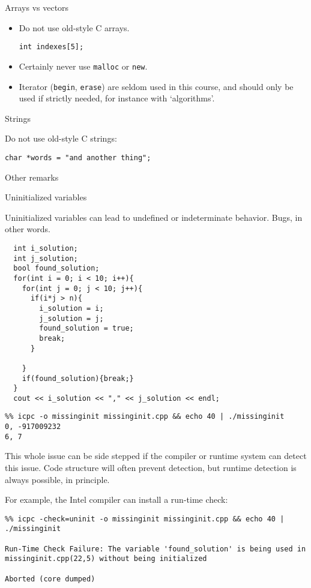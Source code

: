  {Arrays vs vectors}

\begin{itemize}
\item Do not use old-style C arrays.
\begin{lstlisting}
int indexes[5];    
\end{lstlisting}
\item Certainly never use \lstinline{malloc} or \lstinline{new}.
\item Iterator (\lstinline{begin}, \lstinline{erase}) are
  seldom used in this course, and should only be used if strictly needed,
  for instance with `algorithms'.
\end{itemize}

 {Strings}

Do not use old-style C strings:
\begin{lstlisting}
char *words = "and another thing";
\end{lstlisting}

 {Other remarks}

 {Uninitialized variables}

Uninitialized variables can lead to undefined or indeterminate behavior.
Bugs, in other words.

\lstset{language=C++}
\begin{lstlisting}
  int i_solution;
  int j_solution;
  bool found_solution;
  for(int i = 0; i < 10; i++){
    for(int j = 0; j < 10; j++){
      if(i*j > n){
        i_solution = i;
        j_solution = j;
        found_solution = true;
        break;
      }

    }
    if(found_solution){break;}
  }
  cout << i_solution << "," << j_solution << endl;
\end{lstlisting}

\begin{verbatim}
%% icpc -o missinginit missinginit.cpp && echo 40 | ./missinginit
0, -917009232
6, 7
\end{verbatim}

This whole issue can be side stepped if the compiler or runtime system
can detect this issue.
Code structure will often prevent detection, 
but runtime detection is always possible, in principle.

For example, the Intel compiler can install a run-time check:

\begin{verbatim}
%% icpc -check=uninit -o missinginit missinginit.cpp && echo 40 | ./missinginit

Run-Time Check Failure: The variable 'found_solution' is being used in missinginit.cpp(22,5) without being initialized

Aborted (core dumped)
\end{verbatim}


